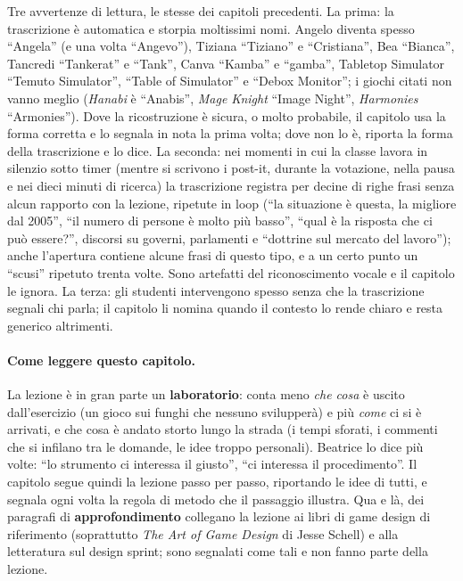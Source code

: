 Tre avvertenze di lettura, le stesse dei capitoli precedenti. La prima: la
trascrizione è automatica e storpia moltissimi nomi. Angelo diventa spesso
``Angela'' (e una volta ``Angevo''), Tiziana ``Tiziano'' e ``Cristiana'', Bea
``Bianca'', Tancredi ``Tankerat'' e ``Tank'', Canva ``Kamba'' e ``gamba'', Tabletop
Simulator ``Temuto Simulator'', ``Table of Simulator'' e ``Debox Monitor''; i giochi
citati non vanno meglio (\emph{Hanabi} è ``Anabis'', \emph{Mage Knight} ``Image
Night'', \emph{Harmonies} ``Armonies''). Dove la ricostruzione è sicura, o molto
probabile, il capitolo usa la forma corretta e lo segnala in nota la prima volta;
dove non lo è, riporta la forma della trascrizione e lo dice. La seconda: nei
momenti in cui la classe lavora in silenzio sotto timer (mentre si scrivono i
post-it, durante la votazione, nella pausa e nei dieci minuti di ricerca) la
trascrizione registra per decine di righe frasi senza alcun rapporto con la lezione,
ripetute in loop (``la situazione è questa, la migliore dal 2005'', ``il numero di
persone è molto più basso'', ``qual è la risposta che ci può essere?'', discorsi
su governi, parlamenti e ``dottrine sul mercato del lavoro''); anche l'apertura
contiene alcune frasi di questo tipo, e a un certo punto un ``scusi'' ripetuto
trenta volte. Sono artefatti del riconoscimento vocale e il capitolo le ignora. La
terza: gli studenti intervengono spesso senza che la trascrizione segnali chi
parla; il capitolo li nomina quando il contesto lo rende chiaro e resta generico
altrimenti.

\paragraph{Come leggere questo capitolo.} La lezione è in gran parte un
\textbf{laboratorio}: conta meno \emph{che cosa} è uscito dall'esercizio (un gioco
sui funghi che nessuno svilupperà) e più \emph{come} ci si è arrivati, e che cosa è
andato storto lungo la strada (i tempi sforati, i commenti che si infilano tra le
domande, le idee troppo personali). Beatrice lo dice più volte: ``lo strumento ci
interessa il giusto'', ``ci interessa il procedimento''. Il capitolo segue quindi
la lezione passo per passo, riportando le idee di tutti, e segnala ogni volta la
regola di metodo che il passaggio illustra. Qua e là, dei paragrafi di
\textbf{approfondimento} collegano la lezione ai libri di game design di riferimento
(soprattutto \emph{The Art of Game Design} di Jesse Schell) e alla letteratura sul
design sprint; sono segnalati come tali e non fanno parte della lezione.

